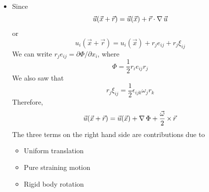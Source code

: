 \begin{itemize}
\item Since 
\[
\vec{u}(\vec{x} + \vec{r}) = \vec{u}(\vec{x}) + \vec{r}\cdot\operatorname{\nabla}{\vec{u}}
\]
or
\[
u_i(\vec{x} + \vec{r}) = u_i(\vec{x}) + r_j e_{ij} + r_j \xi_{ij}
\]
We can write $r_j e_{ij} = \partial\Phi/\partial x_i$, where 
\[
\Phi = \frac{1}{2}r_i e_{ij} r_j
\]
We also saw that 
\[
r_j \xi_{ij} = \frac{1}{2}\epsilon_{ijk}\omega_{j} r_k
\]
Therefore,
\begin{equation}\label{c2s3e6}
\vec{u}(\vec{x} + \vec{r}) = \vec{u}(\vec{x}) + \operatorname{\nabla}{\Phi} + \frac{\vec{\omega}}{2} \operatorname{\times} \vec{r}
\end{equation}
The three terms on the right hand side are contributions due to
\begin{itemize}
\item Uniform translation 
\item Pure straining motion
\item Rigid body rotation
\end{itemize}


\end{itemize}
